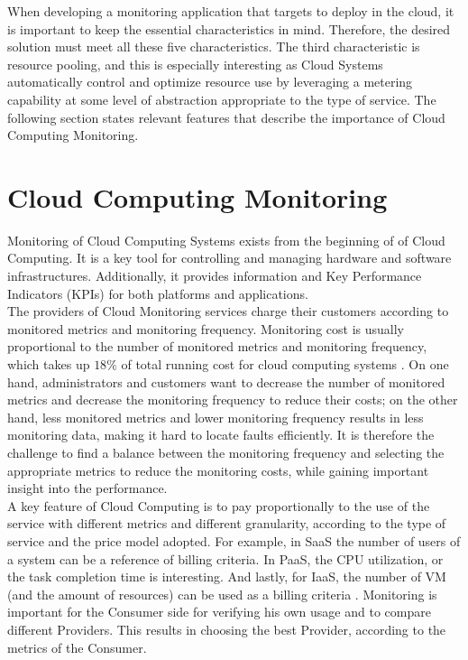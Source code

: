 \noindent
When developing a monitoring application that targets to deploy in the cloud, it is important to keep the essential characteristics in mind. Therefore, the desired solution must meet all these five characteristics. The third characteristic is resource pooling, and this is especially interesting as Cloud Systems automatically control and optimize resource use by leveraging a metering capability at some level of abstraction appropriate to the type of service. The following section states relevant features that describe the importance of Cloud Computing Monitoring.

\section{Cloud Computing Monitoring} \label{sec:intro_monitoring}
Monitoring of Cloud Computing Systems exists from the beginning of of Cloud Computing. It is a key tool for controlling and managing hardware and software infrastructures. Additionally, it provides information and Key Performance Indicators (KPIs) for both platforms and applications.\\

\noindent
The providers of Cloud Monitoring services charge their customers according to monitored metrics and monitoring frequency. Monitoring cost is usually proportional to the number of monitored metrics and monitoring frequency, which takes up $18\%$ of total running cost for cloud computing systems \cite{wang2018self}. On one hand, administrators and customers want to decrease the number of monitored metrics and decrease the monitoring frequency to reduce their costs; on the other hand, less monitored metrics and lower monitoring frequency results in less monitoring data, making it hard to locate faults efficiently. It is therefore the challenge to find a balance between the monitoring frequency and selecting the appropriate metrics to reduce the monitoring costs, while gaining important insight into the performance.\\

\noindent
A key feature of Cloud Computing is to pay proportionally to the use of the service with different metrics and different granularity, according to the type of service and the price model adopted. For example, in SaaS the number of users of a system can be a reference of billing criteria. In PaaS, the CPU utilization, or the task completion time is interesting. And lastly, for IaaS, the number of VM (and the amount of resources) can be used as a billing criteria \cite{katsaros2011building}. Monitoring is important for the Consumer side for verifying his own usage and to compare different Providers. This results in choosing the best Provider, according to the metrics of the Consumer.\\


